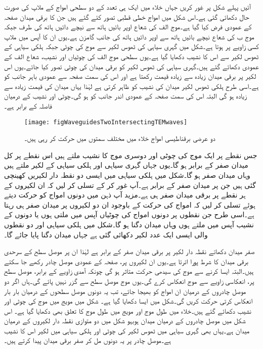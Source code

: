 آئیں پہلے شکل  پر غور کریں جہاں خلاء میں ایک ہی تعدد کے دو سطحی  امواج کے ملاپ کی صورت حال دکھائی گئی ہے۔اس شکل میں امواج خطی قطبی تصور کئے گئے ہیں جن کا برقی میدان صفحہ کے عمودی فرض کیا گیا ہے۔موج الف کی شعاع اوپر بائیں ہاتھ سے نیچے دائیں ہاتھ کی طرف جبکہ موج ب کی شعاع نیچے بائیں ہاتھ سے اوپر دائیں ہاتھ کی جانب گامزن ہے۔یوں ان کا آپس میں ملاپ کسی زاویے پر ہوتا ہے۔شکل میں گہری سیاہی کی ٹھوس لکیر سے موج کی چوٹی جبکہ ہلکی سیاہی کے ٹھوس لکیر سے اس کا نشیب دکھایا گیا ہے۔یوں سطحی موج الف کی چوٹیاں اور نشیب، شعاع الف کے عمودی دکھائے گئے ہیں۔گہری سیاہی کی ٹھوس لکیر کو برقی میدان کی چوٹی تصور کیا جائے۔یوں اس لکیر پر برقی میدان زیادہ سے زیادہ قیمت رکھتا ہے اور اس کی سمت صفحہ سے عمودی باہر جانب کو ہے۔اسی طرح ہلکی ٹھوس لکیر میدان کی نشیب کو ظاہر کرتی ہے لہٰذا یہاں میدان کی قیمت زیادہ سے زیادہ ہو گی البتہ اس کی سمت صفحہ کے عمودی اندر جانب کو ہو گی۔چوٹی اور نشیب کے درمیان فاصلہ  کے برابر ہے۔ 
%
\begin{figure}
\centering
\texttt{[image: figWaveguidesTwoIntersectingTEMwaves]}
\caption{دو عرضی برقناطیسی امواج خلاء میں مختلف سمتوں میں حرکت کر رہی ہیں۔}
\label{شکل_مویج_دو_عرضی_امواج_خالی_خلاء}
\end{figure}

جس نقطے پر ایک موج کی چوٹی اور دوسری موج کا نشیب ملتے ہیں اس نقطے پر کل میدان صفر کے برابر ہو گا۔یوں جہاں گہری سیاہی اور ہلکی سیاہی کے لکیر ملتے ہیں وہاں میدان صفر ہو گا۔شکل میں ہلکی سیاہی میں ایسی دو نقطہ دار لکیریں کھینچی گئی ہیں جن پر میدان صفر کے برابر ہے۔آپ غور کر کے تسلی کر لیں کہ ان لکیروں کے ہر نقطے پر برقی میدان صفر ہی ہے۔مزید آپ ذہن میں دونوں امواج کو حرکت دیتے ہوئے تسلی کر لیں کہ امواج کی حرکت کے باوجود ان دو لکیروں پر میدان صفر ہی رہتا ہے۔اسی طرح جن نقطوں پر دونوں امواج کی چوٹیاں آپس میں ملتی ہوں یا دونوں کے نشیب آپس میں ملتے ہوں وہاں میدان دگنا ہو گا۔شکل میں ہلکی سیاہی اور دو نقطوں والی ایسی ایک عدد  لکیر دکھائی گئی ہے جہاں میدان دگنا پایا جائے گا۔

صفر میدان دکھاتے نقطہ دار لکیر پر برقی میدان صفر کے برابر ہے لہٰذا ان پر موصل سطح کے سرحدی برقی میدان کا شرط پورا اترتا ہے۔یوں ان لکیروں پر، صفحہ کے عمودی  موصل چادر رکھے جا سکتے ہیں۔البتہ ایسا کرنے سے موج کی سیدھی حرکت متاثر ہو گی چونکہ آمدی زاویے کے برابر، موصل سطح پر، انعکاسی زاویے سے موج انعکاس کرے گی۔یوں موج موصل سطح سے گزر نہیں پائے گی۔ہاں اگر دو موصل چادروں کے درمیان ان امواج کو بھیجا جائے، تب یہ دونوں موصل سطحوں کے درمیان بار بار انعکاس کرتی حرکت کریں گی۔شکل  میں ایسا دکھایا گیا ہے۔ شکل  میں مویج میں موج کی چوٹی اور نشیب دکھائے گئے ہیں۔خلاء میں طول موج اور مویج میں طول موج کا تعلق بھی دکھایا گیا ہے۔ اس شکل میں موصل چادروں کے درمیان میدان ہوبہو شکل  میں دو متوازی نقطہ دار لکیروں کے درمیان میدان ہے۔یہاں بھی گہری سیاہی میں ٹھوس لکیر  کی چوٹی اور ہلکی سیاہی میں لکیر اس کا نشیب ہے۔موصل چادر پر یہ دونوں مل کر صفر برقی میدان پیدا کرتے ہیں۔   

